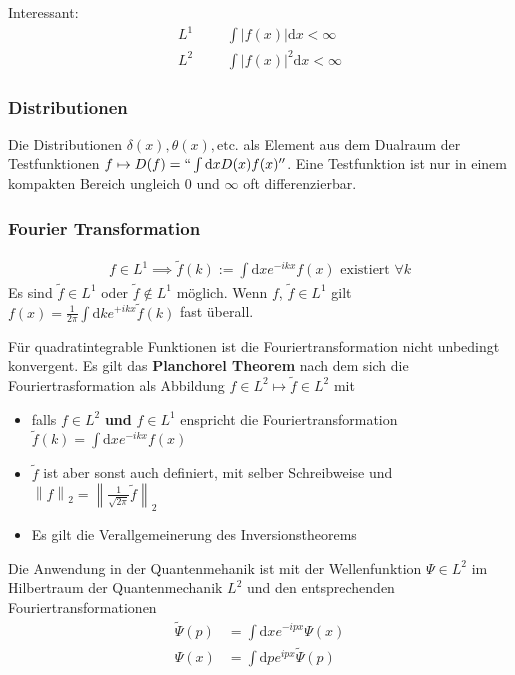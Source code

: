 \documentclass[11pt,a4paper]{report}
\newcommand{\norm}[1]{\left\lVert #1 \right\rVert}
\begin{document}
Interessant:
\begin{align*}
    L^1 &&&\int |f(x)| \mathrm{d}x < \infty \\
    L^2 &&&\int |f(x)|^2 \mathrm{d}x < \infty
\end{align*}

\subsubsection{Distributionen}

Die Distributionen $\delta(x), \theta(x), \text{etc.}$ als Element aus dem Dualraum der Testfunktionen $f \mapsto D(f) = ``\int \mathrm{d}x D(x) f(x)''$.
Eine Testfunktion ist nur in einem kompakten Bereich ungleich $0$ und $\infty$ oft differenzierbar.

\subsubsection{Fourier Transformation}

\begin{align*}
    f \in L^1 \implies \tilde{f}(k) := \int \mathrm{d}x e^{-i k x} f(x) \text{ existiert } \forall k 
\end{align*}
Es sind $\tilde{f} \in L^1$ oder $\tilde{f} \notin L^1$ möglich.
Wenn $f$, $\tilde{f} \in L^1$ gilt $f(x) = \frac{1}{2\pi} \int \mathrm{d}k e^{+ i k x} \tilde{f}(k)$ fast überall.

Für quadratintegrable Funktionen ist die Fouriertransformation nicht unbedingt konvergent.
Es gilt das \textbf{Planchorel Theorem} nach dem sich die Fouriertrasformation als Abbildung $f \in L^2 \mapsto \tilde{f} \in L^2$ mit 
\begin{itemize}
    \item falls $f \in L^2$ \textbf{und} $f \in L^1$ enspricht die Fouriertransformation $\tilde{f}(k) = \int \mathrm{d}x e^{-i k x} f(x)$
    \item $\tilde{f}$ ist aber sonst auch definiert, mit selber Schreibweise und $\norm{f}_2 = \norm{\frac{1}{\sqrt{2\pi}} \tilde{f}}_2$
    \item Es gilt die Verallgemeinerung des Inversionstheorems
\end{itemize}

Die Anwendung in der Quantenmehanik ist mit der Wellenfunktion $\Psi \in L^2$ im Hilbertraum der Quantenmechanik $L^2$ und den entsprechenden Fouriertransformationen
\begin{align*}
    \tilde{\Psi}(p) &= \int \mathrm{d}x e^{-i p x} \Psi(x) \\
    \Psi(x) &= \int \mathrm{d}p e^{i p x} \tilde{\Psi}(p)
\end{align*}
\end{document}
